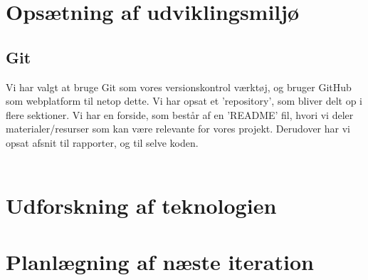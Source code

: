 \documentclass[11pt]{article}
\begin{document}
\section{Opsætning af udviklingsmiljø}
\subsection{Git}
Vi har valgt at bruge Git som vores versionskontrol værktøj, og bruger GitHub som webplatform til netop dette. Vi har opsat et 'repository', som bliver delt op i flere sektioner. Vi har en forside, som består af en 'README' fil, hvori vi deler materialer/resurser som kan være relevante for vores projekt. Derudover har vi opsat afsnit til rapporter, og til selve koden. \\ \\

\section{Udforskning af teknologien}
\section{Planlægning af næste iteration}
\end{document}
